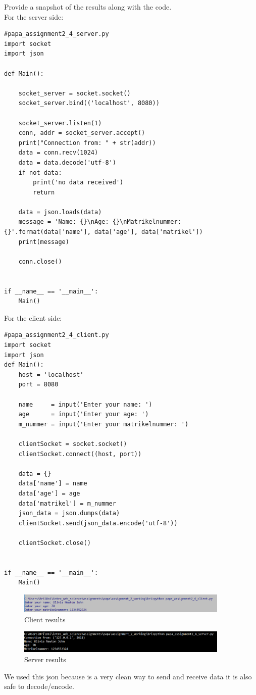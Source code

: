 \documentclass{WeSTassignment}
\begin{document}
Provide a snapshot of the results along with the code. \\


For the server side:
\begin{lstlisting}
#papa_assignment2_4_server.py
import socket
import json

def Main():

    socket_server = socket.socket()
    socket_server.bind(('localhost', 8080))

    socket_server.listen(1)
    conn, addr = socket_server.accept()
    print("Connection from: " + str(addr))
    data = conn.recv(1024)
    data = data.decode('utf-8')
    if not data:
        print('no data received')
        return

    data = json.loads(data)
    message = 'Name: {}\nAge: {}\nMatrikelnummer: {}'.format(data['name'], data['age'], data['matrikel'])
    print(message)

    conn.close()


if __name__ == '__main__':
    Main()
\end{lstlisting}

For the client side:
\begin{lstlisting}
#papa_assignment2_4_client.py
import socket
import json 
def Main():
    host = 'localhost'
    port = 8080

    name     = input('Enter your name: ')
    age      = input('Enter your age: ')
    m_nummer = input('Enter your matrikelnummer: ')

    clientSocket = socket.socket()
    clientSocket.connect((host, port))

    data = {}
    data['name'] = name
    data['age'] = age
    data['matrikel'] = m_nummer
    json_data = json.dumps(data)
    clientSocket.send(json_data.encode('utf-8'))

    clientSocket.close()


if __name__ == '__main__':
    Main()
\end{lstlisting}
\begin{figure}[h]
  	\centering
  	\includegraphics[width=0.9\textwidth]{results_client.png}
   	\caption{Client results}
     \label{fig:client}
\end{figure}
\begin{figure}[!ht]
  	\centering
  	\includegraphics[width=0.9\textwidth]{results_server.png}
   	\caption{Server results}
     \label{fig:server}
\end{figure}


We used this json because is a very clean way to send and receive data it is also safe to decode/encode.
\makefooter
\end{document}
